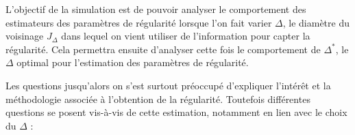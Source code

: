 L'objectif de la simulation est de pouvoir analyser le comportement des estimateurs des paramètres de régularité lorsque l'on fait varier $\Delta$, le diamètre du voisinage $J_\Delta$ dans lequel on vient utiliser de l'information pour capter la régularité. Cela permettra ensuite d'analyser cette fois le comportement de $\Delta^*$, le $\Delta$ optimal pour l'estimation des paramètres de régularité.

Les questions jusqu'alors on s'est surtout préoccupé d'expliquer l'intérêt et la méthodologie associée à l'obtention de la régularité. Toutefois différentes questions se posent vis-à-vis de cette estimation, notamment en lien avec le choix du $\Delta$ :



